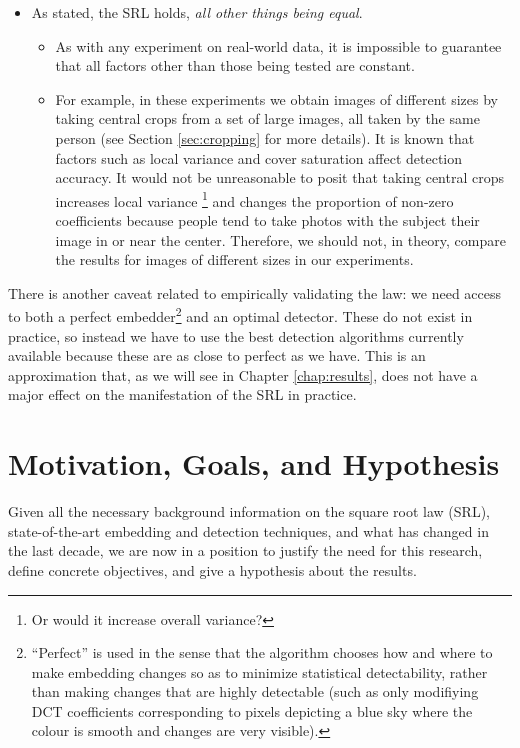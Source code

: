 \documentclass[11pt,a4paper,twoside,openright]{report}
\begin{document}
\begin{itemize}
	\item As stated, the SRL holds, \textit{all other things being equal}.
		\begin{itemize}
			\item As with any experiment on real-world data, it is impossible to guarantee that all factors other than those being tested are constant.
			\item For example, in these experiments we obtain images of different sizes by taking central crops from a set of large images, all taken by the same person (see Section \ref{sec:cropping} for more details). It is known \cite{steganalysis-error-model} that factors such as local variance and cover saturation affect detection accuracy. It would not be unreasonable to posit that taking central crops increases local variance
\footnote{Or would it increase overall variance?} %
and changes the proportion of non-zero coefficients because people tend to take photos with the subject their image in or near the center. Therefore, we should not, in theory, compare the results for images of different sizes in our experiments.
		\end{itemize}

\end{itemize}


There is another caveat related to empirically validating the law: we need access to both a perfect embedder\footnote{``Perfect'' is used in the sense that the algorithm chooses how and where to make embedding changes so as to minimize statistical detectability, rather than making changes that are highly detectable (such as only modifiying DCT coefficients corresponding to pixels depicting a blue sky where the colour is smooth and changes are very visible).} and an optimal detector. These do not exist in practice, so instead we have to use the best detection algorithms currently available because these are as close to perfect as we have. This is an approximation that, as we will see in Chapter \ref{chap:results}, does not have a major effect on the manifestation of the SRL in practice.


\section{Motivation, Goals, and Hypothesis}

Given all the necessary background information on the square root law (SRL), state-of-the-art embedding and detection techniques, and what has changed in the last decade, we are now in a position to justify the need for this research, define concrete objectives, and give a hypothesis about the results.
\end{document}
